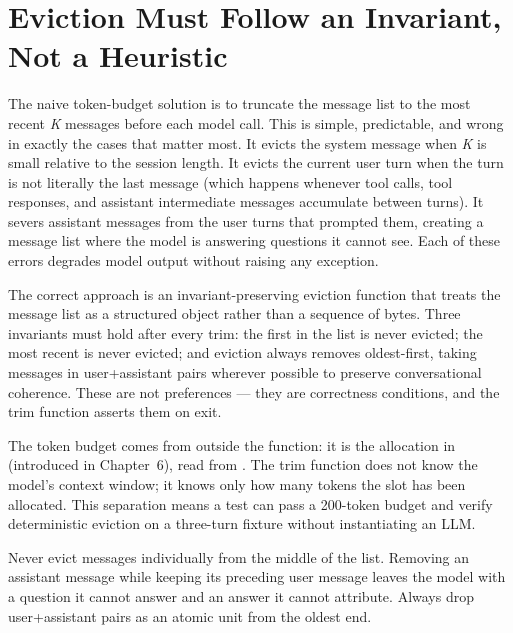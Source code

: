 \section{Eviction Must Follow an Invariant, Not a Heuristic}
\label{sec:trim-messages}

The naive token-budget solution is to truncate the message list to the
most recent \emph{K} messages before each model call. This is simple,
predictable, and wrong in exactly the cases that matter most. It evicts
the system message when \emph{K} is small relative to the session
length. It evicts the current user turn when the turn is not literally
the last message (which happens whenever tool calls, tool responses, and
assistant intermediate messages accumulate between turns). It severs
assistant messages from the user turns that prompted them, creating a
message list where the model is answering questions it cannot see. Each
of these errors degrades model output without raising any exception.

The correct approach is an invariant-preserving eviction function that
treats the message list as a structured object rather than a sequence of
bytes. Three invariants must hold after every trim: the first
 in the list is never evicted; the most recent
 is never evicted; and eviction always removes
oldest-first, taking messages in user+assistant pairs wherever possible
to preserve conversational coherence. These are not preferences --- they
are correctness conditions, and the trim function asserts them on exit.

The token budget comes from outside the function: it is the
 allocation in  (introduced in
Chapter~6), read from . The trim function does not
know the model's context window; it knows only how many tokens the
 slot has been allocated. This separation means a test
can pass a 200-token budget and verify deterministic eviction on a
three-turn fixture without instantiating an LLM.

\begin{warningbox}
Never evict messages individually from the middle of the list. Removing
an assistant message while keeping its preceding user message leaves the
model with a question it cannot answer and an answer it cannot attribute.
Always drop user+assistant pairs as an atomic unit from the oldest end.
\end{warningbox}

